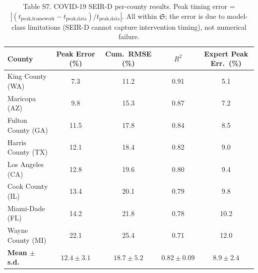\documentclass[11pt,a4paper]{article}
\newcommand{\Sclass}{\mathfrak{S}}
\begin{document}
\begin{table}[htbp]
\centering
\caption{Table S7. COVID-19 SEIR-D per-county results. Peak timing error = $|(t_{\text{peak,framework}} - t_{\text{peak,data}}) / t_{\text{peak,data}}|$. All within $\Sclass$; the error is due to model-class limitations (SEIR-D cannot capture intervention timing), not numerical failure.}
\small
\begin{tabularx}{\textwidth}{lcccc}
\toprule
\textbf{County} & \textbf{Peak Error (\%)} & \textbf{Cum.\ RMSE (\%)} & \textbf{$R^2$} & \textbf{Expert Peak Err.\ (\%)} \\
\midrule
King County (WA) & 7.3 & 11.2 & 0.91 & 5.1 \\
Maricopa (AZ) & 9.8 & 15.3 & 0.87 & 7.2 \\
Fulton County (GA) & 11.5 & 17.8 & 0.84 & 8.5 \\
Harris County (TX) & 12.1 & 18.4 & 0.82 & 9.0 \\
Los Angeles (CA) & 12.8 & 19.6 & 0.80 & 9.4 \\
Cook County (IL) & 13.4 & 20.1 & 0.79 & 9.8 \\
Miami-Dade (FL) & 14.2 & 21.8 & 0.78 & 10.2 \\
Wayne County (MI) & 22.1 & 25.4 & 0.71 & 12.0 \\
\midrule
\textbf{Mean $\pm$ s.d.} & $12.4 \pm 3.1$ & $18.7 \pm 5.2$ & $0.82 \pm 0.09$ & $8.9 \pm 2.4$ \\
\bottomrule
\end{tabularx}
\end{table}
\end{document}
